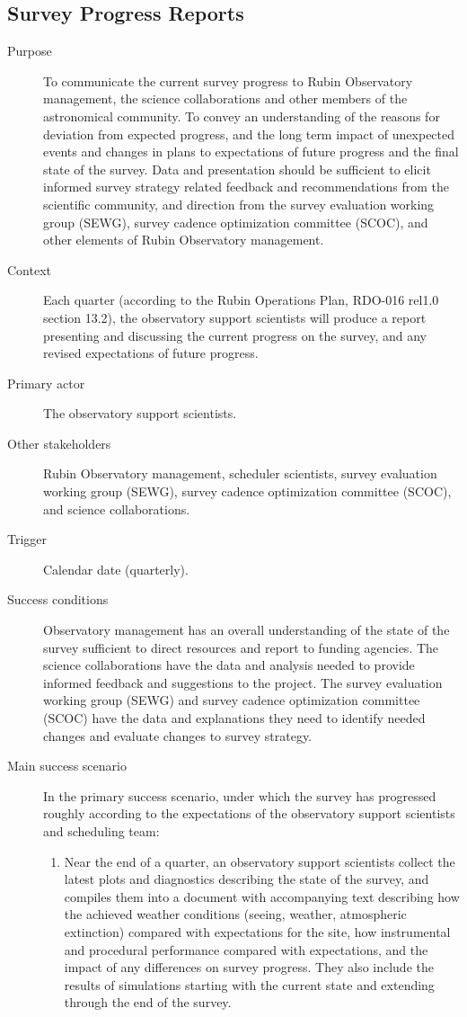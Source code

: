 \subsection{Survey Progress Reports}
\label{sec:org2878c04}
\begin{description}
\item[{Purpose}] To communicate the current survey progress to Rubin Observatory management, the science collaborations and other members of the astronomical community. To convey an understanding of the reasons for deviation from expected progress, and the long term impact of unexpected events and changes in plans to expectations of future progress and the final state of the survey. Data and presentation should be sufficient to elicit informed survey strategy related feedback and recommendations from the scientific community, and direction from the survey evaluation working group (SEWG), survey cadence optimization committee (SCOC), and other elements of Rubin Observatory management.
\item[{Context}] Each quarter (according to the Rubin Operations Plan, RDO-016 rel1.0 section 13.2), the observatory support scientists will produce a report presenting and discussing the current progress on the survey, and any revised expectations of future progress.
\item[{Primary actor}] The observatory support scientists.
\item[{Other stakeholders}] Rubin Observatory management, scheduler scientists, survey evaluation working group (SEWG), survey cadence optimization committee (SCOC), and science collaborations.
\item[{Trigger}] Calendar date (quarterly).
\item[{Success conditions}] Observatory management has an overall understanding of the state of the survey sufficient to direct resources and report to funding agencies. The science collaborations have the data and analysis needed to provide informed feedback and suggestions to the project. The survey evaluation working group (SEWG) and survey cadence optimization committee (SCOC) have the data and explanations they need to identify needed changes and evaluate changes to survey strategy.
\item[{Main success scenario}] In the primary success scenario, under which the survey has progressed roughly according to the expectations of the observatory support scientists and scheduling team:
\begin{enumerate}
\item Near the end of a quarter, an observatory support scientists collect the latest plots and diagnostics describing the state of the survey, and compiles them into a document with accompanying text describing how the achieved weather conditions (seeing, weather, atmospheric extinction) compared with expectations for the site, how instrumental and procedural performance compared with expectations, and the impact of any differences on survey progress. They also include the results of simulations starting with the current state and extending through the end of the survey.

\end{enumerate}
\end{description}
